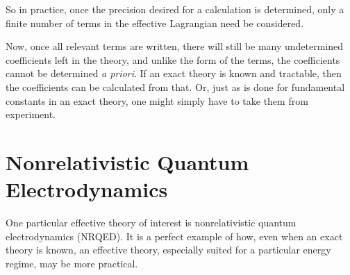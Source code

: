 So in practice, once the precision desired for a calculation is determined, only a finite number of terms in the effective Lagrangian need be considered.

Now, once all relevant terms are written, there will still be many undetermined coefficients left in the theory, and unlike the form of the terms, the coefficients cannot be determined {\it a priori}.  If an exact theory is known and tractable, then the coefficients can be calculated from that.  Or, just as is done for fundamental constants in an exact theory, one might simply have to take them from experiment.

\section{Nonrelativistic Quantum Electrodynamics}
One particular effective theory of interest is nonrelativistic quantum electrodynamics (NRQED).  It is a perfect example of how, even when an exact theory is known, an effective theory, especially suited for a particular energy regime, may be more practical.

